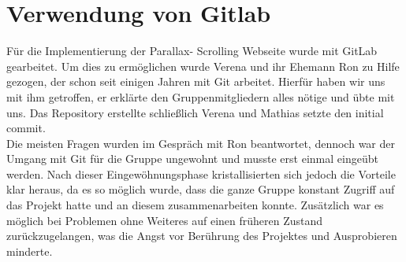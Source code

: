 \section{Verwendung von Gitlab}
Für die Implementierung der Parallax- Scrolling Webseite wurde mit GitLab gearbeitet. Um dies zu ermöglichen wurde Verena und ihr Ehemann Ron zu Hilfe gezogen, der schon seit einigen Jahren mit Git arbeitet. Hierfür haben wir uns mit ihm getroffen, er erklärte den Gruppenmitgliedern alles nötige und übte mit uns. Das Repository erstellte schließlich Verena und Mathias setzte den initial commit.\\
Die meisten Fragen wurden im Gespräch mit Ron beantwortet, dennoch war der Umgang mit Git für die Gruppe ungewohnt und musste erst einmal eingeübt werden. Nach dieser Eingewöhnungsphase kristallisierten sich jedoch die Vorteile klar heraus, da es so möglich wurde, dass die ganze Gruppe konstant Zugriff auf das Projekt hatte und an diesem zusammenarbeiten konnte. Zusätzlich war es möglich bei Problemen ohne Weiteres auf einen früheren Zustand zurückzugelangen, was die Angst vor Berührung des Projektes und Ausprobieren minderte.